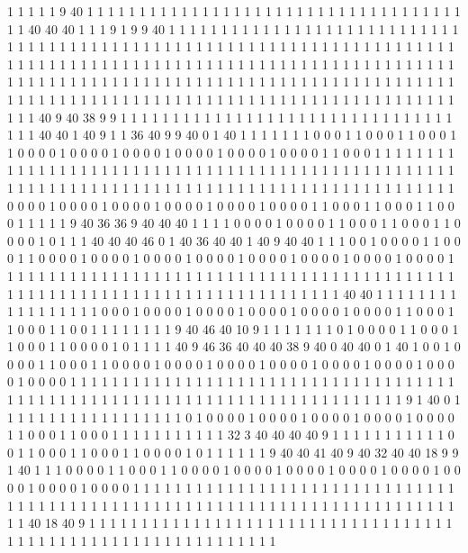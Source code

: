 1 1 1 1 1 9 40 1 1 1 1 1 1 1 1 1 1 1 1 1
1 1 1 1 1 1 1 1 1 1 1 1 1 1 1 1 1 1 1 1
1 1 1 1 1 40 40 40 1 1 1 9 1 9 9 40 1 1 1 1
1 1 1 1 1 1 1 1 1 1 1 1 1 1 1 1 1 1 1 1
1 1 1 1 1 1 1 1 1 1 1 1 1 1 1 1 1 1 1 1
1 1 1 1 1 1 1 1 1 1 1 1 1 1 1 1 1 1 1 1
1 1 1 1 1 1 1 1 1 1 1 1 1 1 1 1 1 1 1 1
1 1 1 1 1 1 1 1 1 1 1 1 1 1 1 1 1 1 1 1
1 1 1 1 1 1 1 1 1 1 1 1 1 1 1 1 1 1 1 1
1 1 1 1 1 1 1 1 1 1 1 1 1 1 1 1 1 1 1 1
1 1 1 1 1 1 1 1 1 1 1 1 1 1 1 1 1 1 1 1
1 1 1 1 1 1 1 1 1 1 1 1 1 1 1 1 1 1 1 1
1 1 1 1 1 1 1 1 1 1 1 1 1 1 1 1 1 1 1 40
9 40 38 9 9 1 1 1 1 1 1 1 1 1 1 1 1 1 1 1
1 1 1 1 1 1 1 1 1 1 1 1 1 1 1 1 1 1 1 1
40 40 1 40 9 1 1 36 40 9 9 40 0 1 40 1 1 1 1 1
1 1 0 0 0 1 1 0 0 0 1 1 0 0 0 1 1 0 0 0
0 1 0 0 0 0 1 0 0 0 0 1 0 0 0 0 1 0 0 0
0 1 0 0 0 0 1 1 0 0 0 1 1 1 1 1 1 1 1 1
1 1 1 1 1 1 1 1 1 1 1 1 1 1 1 1 1 1 1 1
1 1 1 1 1 1 1 1 1 1 1 1 1 1 1 1 1 1 1 1
1 1 1 1 1 1 1 1 1 1 1 1 1 1 1 1 1 1 1 1
1 1 1 1 1 1 1 1 1 1 1 1 1 1 1 1 1 1 1 1
1 1 1 1 1 0 0 0 0 1 0 0 0 0 1 0 0 0 0 1
0 0 0 0 1 0 0 0 0 1 0 0 0 0 1 1 0 0 0 1
1 0 0 0 1 1 0 0 0 1 1 1 1 1 9 40 36 36 9 40
40 40 1 1 1 1 0 0 0 0 1 0 0 0 0 1 1 0 0 0
1 1 0 0 0 1 1 0 0 0 0 1 0 1 1 1 40 40 40 46
0 1 40 36 40 40 1 40 9 40 40 1 1 1 0 0 1 0 0 0
0 1 1 0 0 0 1 1 0 0 0 0 1 0 0 0 0 1 0 0
0 0 1 0 0 0 0 1 0 0 0 0 1 0 0 0 0 1 0 0
0 0 1 0 0 0 0 1 1 1 1 1 1 1 1 1 1 1 1 1
1 1 1 1 1 1 1 1 1 1 1 1 1 1 1 1 1 1 1 1
1 1 1 1 1 1 1 1 1 1 1 1 1 1 1 1 1 1 1 1
1 1 1 1 1 1 1 1 1 1 1 1 1 1 1 1 1 1 1 1
1 1 1 40 40 1 1 1 1 1 1 1 1 1 1 1 1 1 1 1
1 1 0 0 0 1 0 0 0 0 1 0 0 0 0 1 0 0 0 0
1 0 0 0 0 1 0 0 0 0 1 1 0 0 0 1 1 0 0 0
1 1 0 0 1 1 1 1 1 1 1 1 9 40 46 40 10 9 1 1
1 1 1 1 1 0 1 0 0 0 0 1 1 0 0 0 1 1 0 0
0 1 1 0 0 0 0 1 0 1 1 1 1 40 9 46 36 40 40 40
38 9 40 0 40 40 0 1 40 1 0 0 1 0 0 0 0 1 1 0
0 0 1 1 0 0 0 0 1 0 0 0 0 1 0 0 0 0 1 0
0 0 0 1 0 0 0 0 1 0 0 0 0 1 0 0 0 0 1 0
0 0 0 1 1 1 1 1 1 1 1 1 1 1 1 1 1 1 1 1
1 1 1 1 1 1 1 1 1 1 1 1 1 1 1 1 1 1 1 1
1 1 1 1 1 1 1 1 1 1 1 1 1 1 1 1 1 1 1 1
1 1 1 1 1 1 1 1 1 1 1 1 1 1 1 1 1 1 9 1
40 0 1 1 1 1 1 1 1 1 1 1 1 1 1 1 1 1 1 1
0 1 0 0 0 0 1 0 0 0 0 1 0 0 0 0 1 0 0 0
0 1 0 0 0 0 1 1 0 0 0 1 1 0 0 0 1 1 1 1
1 1 1 1 1 1 1 32 3 40 40 40 40 9 1 1 1 1 1 1
1 1 1 1 1 0 0 1 1 0 0 0 1 1 0 0 0 1 1 0
0 0 0 1 0 1 1 1 1 1 1 9 40 40 41 40 9 40 32 40
40 18 9 9 1 40 1 1 1 0 0 0 0 1 1 0 0 0 1 1
0 0 0 0 1 0 0 0 0 1 0 0 0 0 1 0 0 0 0 1
0 0 0 0 1 0 0 0 0 1 0 0 0 0 1 0 0 0 0 1
1 1 1 1 1 1 1 1 1 1 1 1 1 1 1 1 1 1 1 1
1 1 1 1 1 1 1 1 1 1 1 1 1 1 1 1 1 1 1 1
1 1 1 1 1 1 1 1 1 1 1 1 1 1 1 1 1 1 1 1
1 1 1 1 1 1 1 1 1 1 1 1 1 1 1 40 18 40 9 1
1 1 1 1 1 1 1 1 1 1 1 1 1 1 1 1 1 1 1 1
1 1 1 1 1 1 1 1 1 1 1 1 1 1 1 1 1 1 1 1
1 1 1 1 1 1 1 1 1 1 1 1 1 1 1 1 1 1 1 1
